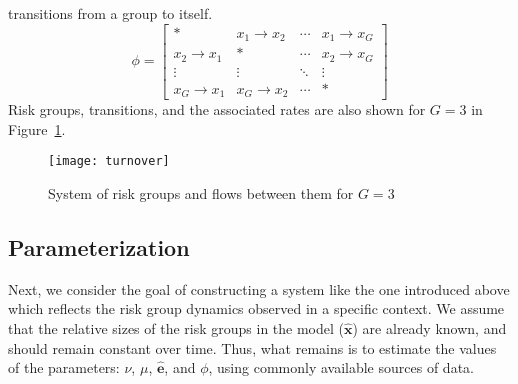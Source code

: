 transitions from a group to itself.
\begin{equation}\label{eq:phi}
\phi = \left[\begin{array}{cccc}
	         *          & x_1  \rightarrow x_2 & \cdots & x_1 \rightarrow x_G \\[0.5em]
	x_2 \rightarrow x_1 &          *           & \cdots & x_2 \rightarrow x_G \\[0.5em]
	      \vdots        &        \vdots        & \ddots &       \vdots        \\[0.5em]
	x_G \rightarrow x_1 & x_G \rightarrow x_2  & \cdots &          *
\end{array}\right]
\end{equation}
Risk groups, transitions, and the associated rates
are also shown for $G = 3$ in Figure~\ref{fig:system}.
\begin{figure}
  \centering
  \texttt{[image: turnover]}
  \caption{System of risk groups and flows between them for $G = 3$}
  \label{fig:system}
\end{figure}
\subsection{Parameterization}
\label{ss:params}
Next, we consider the goal of constructing a system like the one introduced above
which reflects the risk group dynamics observed in a specific context.
We assume that the relative sizes of the risk groups in the model ($\bm{\hat{x}}$)
are already known, and should remain constant over time.
Thus, what remains is to estimate the values of the parameters:
$\nu$, $\mu$, $\bm{\hat{e}}$, and $\phi$,
using commonly available sources of data.
